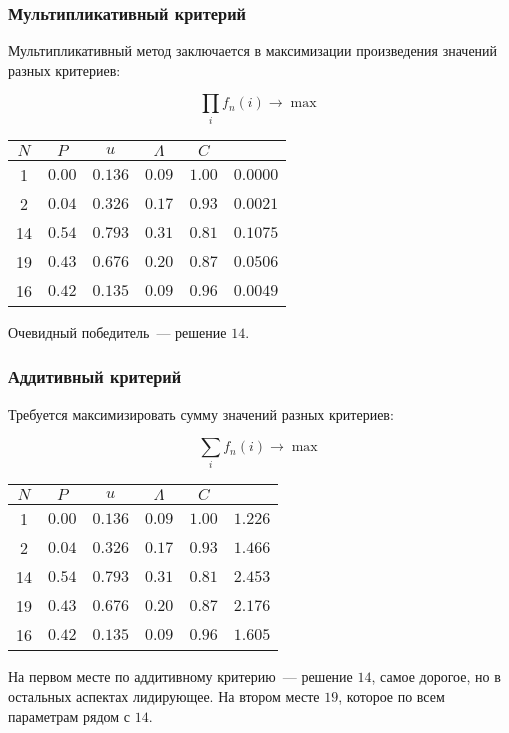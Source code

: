\documentclass[12pt, a4paper] {ncc}
\begin{document}
\subsubsection{Мультипликативный критерий}

Мультипликативный метод заключается в максимизации произведения значений разных
критериев:

$$\prod_i f_n(i) \rightarrow \max$$

\begin{tabular}{|c||c|c|c|c||c|}
\hline
$N$ & $P$    & $u$     & $\Lambda$ & $C$    &          \\ \hline
\hline
1   & $0.00$ & $0.136$ & $0.09$    & $1.00$ & $0.0000$ \\ \hline
2   & $0.04$ & $0.326$ & $0.17$    & $0.93$ & $0.0021$ \\ \hline
14  & $0.54$ & $0.793$ & $0.31$    & $0.81$ & $0.1075$ \\ \hline
19  & $0.43$ & $0.676$ & $0.20$    & $0.87$ & $0.0506$ \\ \hline
16  & $0.42$ & $0.135$ & $0.09$    & $0.96$ & $0.0049$ \\ \hline
\end{tabular}

Очевидный победитель~--- решение $14$.

\subsubsection{Аддитивный критерий}

Требуется максимизировать сумму значений разных критериев:

$$\sum_i f_n(i) \rightarrow \max$$

\begin{tabular}{|c||c|c|c|c||c|}
\hline
$N$ & $P$    & $u$     & $\Lambda$ & $C$    &         \\ \hline
\hline
1   & $0.00$ & $0.136$ & $0.09$    & $1.00$ & $1.226$ \\ \hline
2   & $0.04$ & $0.326$ & $0.17$    & $0.93$ & $1.466$ \\ \hline
14  & $0.54$ & $0.793$ & $0.31$    & $0.81$ & $2.453$ \\ \hline
19  & $0.43$ & $0.676$ & $0.20$    & $0.87$ & $2.176$ \\ \hline
16  & $0.42$ & $0.135$ & $0.09$    & $0.96$ & $1.605$ \\ \hline
\end{tabular}

На первом месте по аддитивному критерию~--- решение $14$, самое дорогое, но в
остальных аспектах лидирующее. На втором месте $19$, которое по всем параметрам
рядом с $14$.
\end{document}

